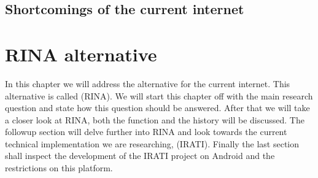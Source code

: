 \section{Shortcomings of the current internet}
\label{sec:internet_shortcomings}


\chapter{RINA alternative}
In this chapter we will address the alternative for the current internet. This alternative is called  (RINA). We will start this chapter off with the main research question and state how this question should be answered. After that we will take a closer look at RINA, both the function and the history will be discussed. The followup section will delve further into RINA and look towards the current technical implementation we are researching,  (IRATI). Finally the last section shall inspect the development of the IRATI project on Android and the restrictions on this platform.

